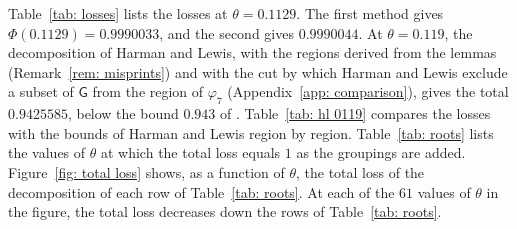 \documentclass{article}
\numberwithin{equation}{section}
\begin{document}
Table~\ref{tab: losses} lists the losses at $\theta = 0.1129$. The first method gives $\Phi(0.1129) = 0.9990033$, and the second gives $0.9990044$. At $\theta = 0.119$, the decomposition of Harman and Lewis, with the regions derived from the lemmas (Remark~\ref{rem: misprints}) and with the cut by which Harman and Lewis exclude a subset of $\mathsf{G}$ from the region of $\varphi_7$ (Appendix~\ref{app: comparison}), gives the total $0.9425585$, below the bound $0.943$ of \citet[p.~134]{harman2001gaussian}. Table~\ref{tab: hl 0119} compares the losses with the bounds of Harman and Lewis region by region. Table~\ref{tab: roots} lists the values of $\theta$ at which the total loss equals $1$ as the groupings are added. Figure~\ref{fig: total loss} shows, as a function of $\theta$, the total loss of the decomposition of each row of Table~\ref{tab: roots}. At each of the $61$ values of $\theta$ in the figure, the total loss decreases down the rows of Table~\ref{tab: roots}.
\end{document}
